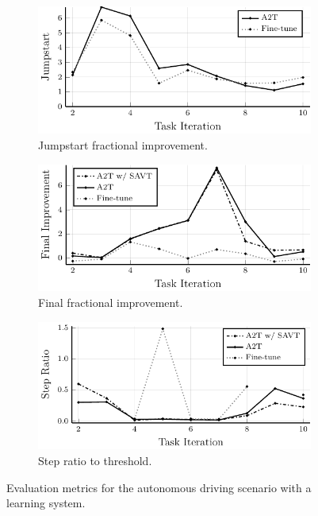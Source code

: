 \begin{figure}
    \centering
    \begin{subfigure}[b]{0.32\textwidth}
        \centering
        \includegraphics[width=\textwidth]{figures/iterative_validation/driving_learning/jumpstart.pdf}
        \caption{Jumpstart fractional improvement.}
        \label{fig:adl_jumpstart}
    \end{subfigure}
    \hfill
    \begin{subfigure}[b]{0.32\textwidth}
        \centering
        \includegraphics[width=\textwidth]{figures/iterative_validation/driving_learning/peak_performance.pdf}
        \caption{Final fractional improvement.}
        \label{fig:adl_final}
    \end{subfigure}
    \hfill
    \begin{subfigure}[b]{0.32\textwidth}
        \centering
        \includegraphics[width=\textwidth]{figures/iterative_validation/driving_learning/steps_to_threshold.pdf}
        \caption{Step ratio to threshold.}
        \label{fig:adl_step}
    \end{subfigure}
    \caption{Evaluation metrics for the autonomous driving scenario with a learning system.}
    \label{fig:adl}
\end{figure}





